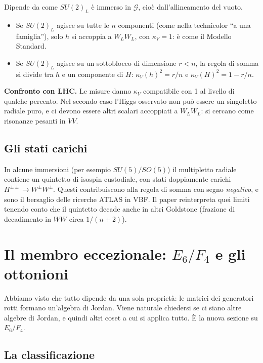 \documentclass[11pt,a4paper]{article}
\numberwithin{equation}{section}
\theoremstyle{remark}
\newcommand{\G}{\mathcal{G}}
\begin{document}
Dipende da come $SU(2)_L$ è immerso in $\G$, cioè dall'allineamento del vuoto.
\begin{itemize}
\item Se $SU(2)_L$ agisce su tutte le $n$ componenti (come nella technicolor ``a una famiglia''), solo $h$ si accoppia a $W_LW_L$, con $\kappa_V=1$: è come il Modello Standard.
\item Se $SU(2)_L$ agisce su un sottoblocco di dimensione $r<n$, la regola di somma si divide tra $h$ e un componente di $H$: $\kappa_V(h)^2=r/n$ e $\kappa_V(H)^2=1-r/n$.
\end{itemize}
\textbf{Confronto con LHC.} Le misure danno $\kappa_V$ compatibile con 1 al livello di qualche percento. Nel secondo caso l'Higgs osservato non può essere un singoletto radiale puro, e ci devono essere altri scalari accoppiati a $W_LW_L$: si cercano come risonanze pesanti in $VV$.

\subsection{Gli stati carichi}

In alcune immersioni (per esempio $SU(5)/SO(5)$) il multipletto radiale contiene un quintetto di isospin custodiale, con stati doppiamente carichi $H^{\pm\pm}\to W^\pm W^\pm$. Questi contribuiscono alla regola di somma con segno \emph{negativo}, e sono il bersaglio delle ricerche ATLAS in VBF. Il paper reinterpreta quei limiti tenendo conto che il quintetto decade anche in altri Goldstone (frazione di decadimento in $WW$ circa $1/(n+2)$).

\section{Il membro eccezionale: $E_6/F_4$ e gli ottonioni}
\label{cap:e6}

\begin{dove}
Abbiamo visto che tutto dipende da una sola proprietà: le matrici dei generatori rotti formano un'algebra di Jordan. Viene naturale chiedersi se ci siano altre algebre di Jordan, e quindi altri coset a cui si applica tutto. È la nuova sezione su $E_6/F_4$.
\end{dove}

\subsection{La classificazione}
\end{document}
